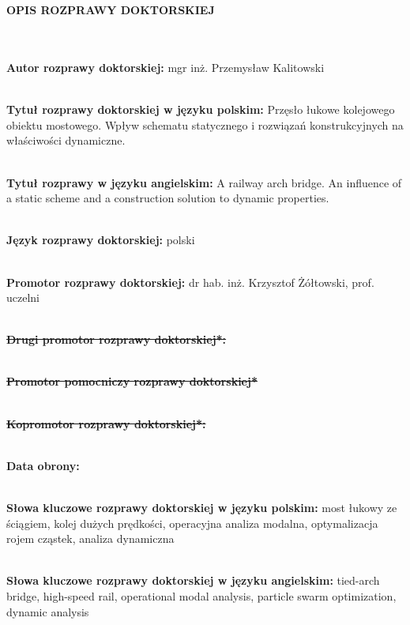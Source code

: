 \begin{figure}
	 \hfill
	
\end{figure}


\begin{myfont}
	\thispagestyle{plain}	
	\noindent
	\\ \\	
	\textbf{OPIS ROZPRAWY DOKTORSKIEJ}
	
	\footnotesize \noindent
	\\ \\
	\textbf{Autor rozprawy doktorskiej:} mgr inż. Przemysław Kalitowski
	
	\noindent
	\\
	\textbf{Tytuł rozprawy doktorskiej w języku polskim:} Przęsło łukowe kolejowego obiektu mostowego. Wpływ schematu statycznego i rozwiązań konstrukcyjnych na właściwości dynamiczne.
	
	\noindent
	\\
	\textbf{Tytuł rozprawy w języku angielskim:} A railway arch bridge. An influence of a static scheme and a construction solution to dynamic properties.
	
	\noindent
	\\
	\textbf{Język rozprawy doktorskiej:} polski
	
	\noindent
	\\
	\textbf{Promotor rozprawy doktorskiej:} dr hab. inż. Krzysztof Żółtowski, prof. uczelni
	
	\noindent
	\\
	{\bfseries \sout{Drugi promotor rozprawy doktorskiej*:}}
	
	\noindent
	\\
	{\bfseries \sout{Promotor pomocniczy rozprawy doktorskiej*}}
	
	\noindent
	\\
	{\bfseries \sout{Kopromotor rozprawy doktorskiej*:}}
	
	\noindent
	\\
	\textbf{Data obrony:}
	
	\noindent
	\\
	\textbf{Słowa kluczowe rozprawy doktorskiej w języku polskim:} most łukowy ze ściągiem, kolej dużych prędkości, operacyjna analiza modalna, optymalizacja rojem cząstek, analiza dynamiczna
	
	\noindent
	\\
	\textbf{Słowa kluczowe rozprawy doktorskiej w języku angielskim:} tied-arch bridge, high-speed rail, operational modal analysis, particle swarm optimization, dynamic analysis 
	\vfill
	

\end{myfont}
